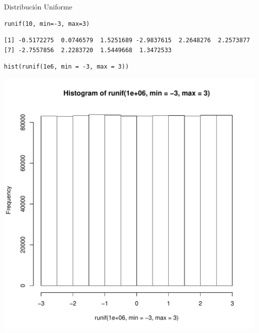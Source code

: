\documentclass[xcolor={usenames,svgnames,dvipsnames}]{beamer}
\begin{document}
\begin{frame}[fragile,label=sec-3-5]{Distribución Uniforme}
 \lstset{language=R,label= ,caption= ,numbers=none}
\begin{lstlisting}
runif(10, min=-3, max=3)
\end{lstlisting}

\begin{verbatim}
[1] -0.5172275  0.0746579  1.5251689 -2.9837615  2.2648276  2.2573877
[7] -2.7557856  2.2283720  1.5449668  1.3472533
\end{verbatim}


\lstset{language=R,label= ,caption= ,numbers=none}
\begin{lstlisting}
hist(runif(1e6, min = -3, max = 3))
\end{lstlisting}

\includegraphics[height=0.6\textheight]{figs/runif.pdf}
\end{frame}
\end{document}
